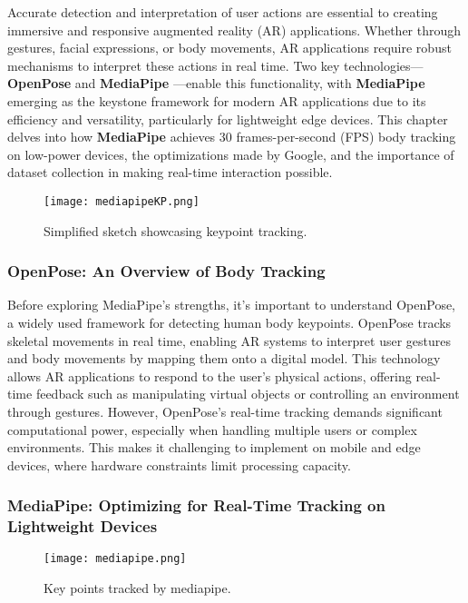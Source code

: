 Accurate detection and interpretation of user actions are essential to creating immersive and responsive augmented reality (AR) applications.
Whether through gestures, facial expressions, or body movements, AR applications require robust mechanisms to interpret these actions in real time.
Two key technologies— \textbf{OpenPose} \cite{cao2017realtime} and \textbf{MediaPipe} \cite{lugaresi2019mediapipe} —enable this functionality, with \textbf{MediaPipe} emerging as the keystone framework for modern AR applications due to its efficiency and versatility, particularly for lightweight edge devices.
This chapter delves into how \textbf{MediaPipe} achieves 30 frames-per-second (FPS) body tracking on low-power devices, the optimizations made by Google, and the importance of dataset collection in making real-time interaction possible.

\begin{figure}[h]
    \centering
    \texttt{[image: mediapipeKP.png]}
    \caption{Simplified sketch showcasing keypoint tracking.}
    \vspace{0.1cm}
    \label{fig:kptracking}
\end{figure}

\subsubsection{ OpenPose: An Overview of Body Tracking}

Before exploring MediaPipe's strengths, it’s important to understand OpenPose, a widely used framework for detecting human body keypoints.
OpenPose tracks skeletal movements in real time, enabling AR systems to interpret user gestures and body movements by mapping them onto a digital model.
This technology allows AR applications to respond to the user’s physical actions, offering real-time feedback such as manipulating virtual objects or controlling an environment through gestures.
However, OpenPose's real-time tracking demands significant computational power, especially when handling multiple users or complex environments.
This makes it challenging to implement on mobile and edge devices, where hardware constraints limit processing capacity.

\subsubsection{ MediaPipe: Optimizing for Real-Time Tracking on Lightweight Devices}

\begin{figure}[h]
    \centering
    \texttt{[image: mediapipe.png]}
    \caption{Key points tracked by mediapipe.}
    \vspace{0.1cm}
    \label{fig:mediapipe}
\end{figure}


